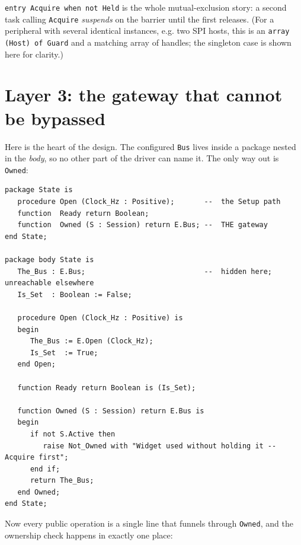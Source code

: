 \texttt{entry Acquire when not Held} is the whole mutual-exclusion story: a second
task calling \texttt{Acquire} \emph{suspends} on the barrier until the first
releases. (For a peripheral with several identical instances, e.g. two SPI
hosts, this is an \texttt{array (Host) of Guard} and a matching array of
handles; the singleton case is shown here for clarity.)

\section{Layer 3: the gateway that cannot be bypassed}

Here is the heart of the design. The configured \texttt{Bus} lives inside a
package nested in the \emph{body}, so no other part of the driver can name it. The
only way out is \texttt{Owned}:

\begin{lstlisting}
package State is
   procedure Open (Clock_Hz : Positive);       --  the Setup path
   function  Ready return Boolean;
   function  Owned (S : Session) return E.Bus; --  THE gateway
end State;

package body State is
   The_Bus : E.Bus;                            --  hidden here; unreachable elsewhere
   Is_Set  : Boolean := False;

   procedure Open (Clock_Hz : Positive) is
   begin
      The_Bus := E.Open (Clock_Hz);
      Is_Set  := True;
   end Open;

   function Ready return Boolean is (Is_Set);

   function Owned (S : Session) return E.Bus is
   begin
      if not S.Active then
         raise Not_Owned with "Widget used without holding it -- Acquire first";
      end if;
      return The_Bus;
   end Owned;
end State;
\end{lstlisting}

Now every public operation is a single line that funnels through \texttt{Owned},
and the ownership check happens in exactly one place:

